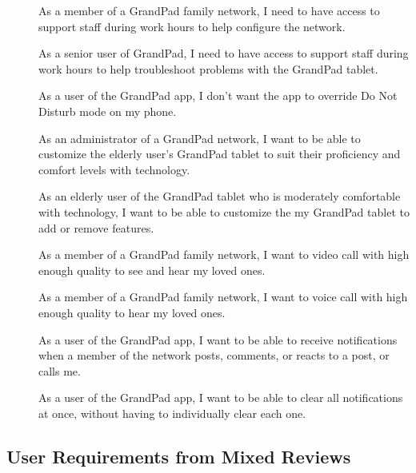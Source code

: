 \begin{description}
    \item[\textbf{\showuserhelpcounter}]
        As a member of a GrandPad family network, I need to have access to
            support staff during work hours to help configure the network.
    \item[\textbf{\showuserhelpcounter}]
        As a senior user of GrandPad, I need to have access to support staff
            during work hours to help troubleshoot problems with the GrandPad
            tablet.
    \item[\textbf{\showuseruicounter}]
        As a user of the GrandPad app, I don't want the app to override
            Do Not Disturb mode on my phone.
    \item[\textbf{\showuseruicounter}]
        As an administrator of a GrandPad network, I want to be able to
            customize the elderly user's GrandPad tablet to suit their
            proficiency and comfort levels with technology.
    \item[\textbf{\showuseruicounter}]
        As an elderly user of the GrandPad tablet who is moderately comfortable
            with technology, I want to be able to customize the my GrandPad
            tablet to add or remove features.
    \item[\textbf{\showusercallcounter}]
        As a member of a GrandPad family network, I want to video call with high
            enough quality to see and hear my loved ones.
    \item[\textbf{\showusercallcounter}]
        As a member of a GrandPad family network, I want to voice call with high
            enough quality to hear my loved ones.
    \item[\textbf{\showuserpostcounter}]
        As a user of the GrandPad app, I want to be able to receive
            notifications when a member of the network posts, comments, or
            reacts to a post, or calls me.
    \item[\textbf{\showuseruicounter}]
        As a user of the GrandPad app, I want to be able to clear all
            notifications at once, without having to individually clear each
            one.
\end{description}

\subsection*{User Requirements from Mixed Reviews}

